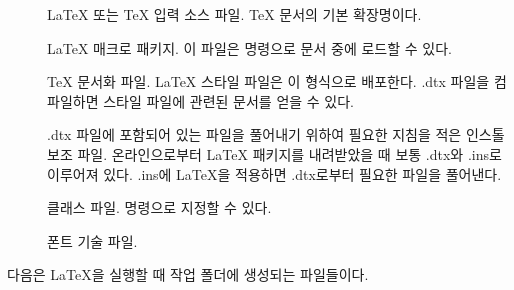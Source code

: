 

\begin{description}

\item[] \LaTeX{} 또는 \TeX{} 입력 소스 파일. \TeX{} 문서의 기본 확장명이다.
\item[] \LaTeX{} 매크로 패키지.
  이 파일은  명령으로 문서 중에 로드할 수 있다.
\item[] 
  \TeX{} 문서화 파일. \LaTeX{} 스타일 파일은 이 형식으로 배포한다.
  .dtx 파일을 컴파일하면 스타일 파일에 관련된 문서를 얻을 수 있다.
\item[] 
  .dtx 파일에 포함되어 있는 파일을 풀어내기 위하여 필요한 지침을 적은 
  인스톨 보조 파일. 온라인으로부터 \LaTeX{} 패키지를 내려받았을 때 
  보통 .dtx와 .ins로 이루어져 있다. .ins에 \LaTeX 을 적용하면 
  .dtx로부터 필요한 파일을 풀어낸다.
\item[]
  클래스 파일.  명령으로 지정할 수 있다.
\item[] 
  폰트 기술 파일. 
\end{description}



다음은 \LaTeX 을 실행할 때 작업 폴더에 생성되는 파일들이다.

